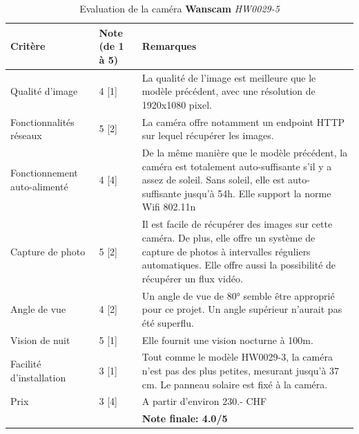 \begin{table}[H]
    \centering
    \caption{Evaluation de la caméra \textbf{Wanscam} \textit{HW0029-5}}
    \label{cam:wan5_eval}
    \begin{tabular}{@{}llp{8cm}@{}}
        \toprule
        Critère                      & Note (de 1 à 5) & Remarques                                           \\ \midrule
        Qualité d'image              & 4 {[}1{]}       & La qualité de l'image est meilleure que le modèle précédent, avec une résolution de 1920x1080 pixel.                                                              \\ [0.8ex]
        Fonctionnalités réseaux      & 5 {[}2{]}       & La caméra offre notamment un endpoint HTTP sur lequel récupérer les images.                                                                                       \\ [0.8ex]
        Fonctionnement auto-alimenté & 4 {[}4{]}       & De la même manière que le modèle précédent, la caméra est totalement auto-suffisante s'il y a assez de soleil. Sans soleil, elle est auto-suffisante jusqu'à 54h. Elle support la norme Wifi 802.11n \\ [0.8ex]
        Capture de photo             & 5 {[}2{]}       & Il est facile de récupérer des images sur cette caméra. De plus, elle offre un système de capture de photos à intervalles réguliers automatiques. Elle offre aussi la possibilité de récupérer un flux vidéo.                  \\ [0.8ex]
        Angle de vue                 & 4 {[}2{]}       & Un angle de vue de 80° semble être approprié pour ce projet. Un angle supérieur n'aurait pas été superflu.                                                        \\ [0.8ex]
        Vision de nuit               & 5 {[}1{]}       & Elle fournit une vision nocturne à 100m.                                                                                                                          \\ [0.8ex]
        Facilité d'installation      & 3 {[}1{]}       & Tout comme le modèle HW0029-3, la caméra n'est pas des plus petites, mesurant jusqu'à 37 cm. Le panneau solaire est fixé à la caméra.                             \\ [0.8ex]
        Prix                         & 3 {[}4{]}       & A partir d'environ 230.- CHF   \\ \midrule
        && \textbf{Note finale: 4.0/5} \\ \bottomrule
    \end{tabular}
\end{table}

